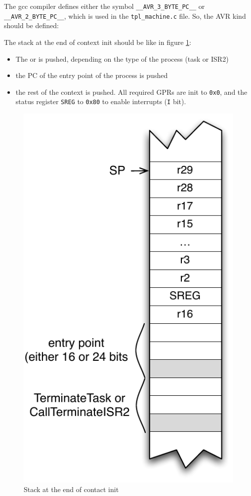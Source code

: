 The gcc compiler defines either the symbol \texttt{\_\_AVR\_3\_BYTE\_PC\_\_} or \texttt{\_\_AVR\_2\_BYTE\_PC\_\_}, which is used in the \texttt{tpl\_machine.c} file.
So, the AVR kind should be defined:

The stack at the end of context init should be like in figure \ref{fig:avr8-stackInit}:
\begin{itemize}
\item The  or  is pushed, depending on the type of the process (task or ISR2)
\item the PC of the entry point of the process is pushed
\item the rest of the context is pushed. All required GPRs are init to \texttt{0x0}, and the status register \texttt{SREG} to \texttt{0x80} to enable interrupts (\texttt{I} bit).
\end{itemize}
\begin{figure}[htbp] %
\begin{minipage}{0.4\textwidth}
    \centering
  \includegraphics[scale=.6]{pictures/avr8-stackInit.pdf} 
\end{minipage}
\begin{minipage}{0.6\textwidth}
  \caption{Stack at the end of contact init}\label{fig:avr8-stackInit}
\end{minipage}
\end{figure}

